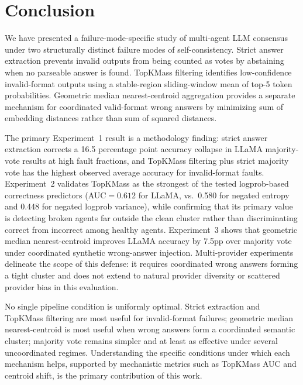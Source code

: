 \documentclass[11pt]{article}
\begin{document}
\section{Conclusion}
\label{sec:conclusion}

We have presented a failure-mode-specific study of multi-agent LLM consensus
under two structurally distinct failure modes of self-consistency. Strict answer
extraction prevents invalid outputs from being counted as votes by abstaining
when no parseable answer is found. TopKMass filtering identifies low-confidence
invalid-format outputs using a stable-region sliding-window mean of top-5 token
probabilities. Geometric median nearest-centroid aggregation provides a separate
mechanism for coordinated valid-format wrong answers by minimizing sum of
embedding distances rather than sum of squared distances.

The primary Experiment~1 result is a methodology finding: strict answer
extraction corrects a 16.5 percentage point accuracy collapse in LLaMA
majority-vote results at high fault fractions, and TopKMass filtering plus
strict majority vote has the highest observed average accuracy for invalid-format
faults. Experiment~2 validates TopKMass as the strongest of the tested
logprob-based correctness predictors (AUC$=0.612$ for LLaMA, vs.\ 0.580 for
negated entropy and 0.448 for negated logprob variance), while confirming that
its primary value is detecting broken agents far outside the clean cluster rather
than discriminating correct from incorrect among healthy agents. Experiment~3
shows that geometric median nearest-centroid improves LLaMA accuracy by 7.5pp
over majority vote under coordinated synthetic wrong-answer injection.
Multi-provider experiments delineate the scope of this defense: it requires
coordinated wrong answers forming a tight cluster and does not extend to natural
provider diversity or scattered provider bias in this evaluation.

No single pipeline condition is uniformly optimal. Strict extraction and TopKMass
filtering are most useful for invalid-format failures; geometric median
nearest-centroid is most useful when wrong answers form a coordinated semantic
cluster; majority vote remains simpler and at least as effective under several
uncoordinated regimes. Understanding the specific conditions under which each
mechanism helps, supported by mechanistic metrics such as TopKMass AUC and
centroid shift, is the primary contribution of this work.
\end{document}
